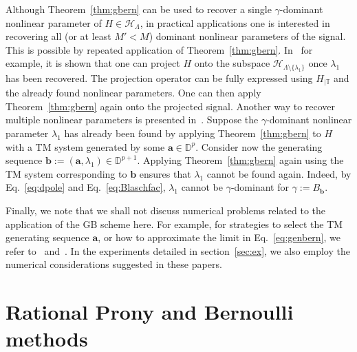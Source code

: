 \documentclass{arxiv}
\begin{document}
Although Theorem~\ref{thm:gbern} can be used to recover a single $\gamma$-dominant nonlinear parameter of $H \in \mathcal{H}_{\Lambda}$, in practical applications one is interested in recovering all (or at least $M' < M$) dominant nonlinear parameters of the signal. This is possible by repeated application of Theorem~\ref{thm:gbern}. In~\cite{SBS, SSSAB} for example, it is shown that one can project $H$ onto the subspace $\mathcal{H}_{\Lambda \setminus \{\lambda_1\}}$
once $\lambda_1$ has been recovered. The projection operator can be fully expressed using $H_{|\mathbb{T}}$ and the already found nonlinear parameters. One can then apply Theorem~\ref{thm:gbern} again onto the projected signal. Another way to recover multiple nonlinear parameters is presented in~\cite{siamdozsa, med24}. Suppose the $\gamma$-dominant nonlinear parameter $\lambda_1$ has already been found by applying Theorem~\ref{thm:gbern} to $H$ with a TM system generated by some $\boldsymbol{a} \in \mathbb{D}^p$. Consider now the generating sequence $\boldsymbol{b} := (\boldsymbol{a}, \lambda_1) \in \mathbb{D}^{p+1}$. Applying Theorem~\ref{thm:gbern} again using the TM system corresponding to $\boldsymbol{b}$ ensures that $\lambda_1$ cannot be found again. Indeed, by Eq.~\eqref{eq:dpole} and Eq.~\eqref{eq:Blaschfac}, $\lambda_1$ cannot be $\gamma$-dominant for $\gamma := B_{\boldsymbol{b}}$. 

Finally, we note that we shall not discuss numerical problems related to the application of the GB scheme here. For example, for strategies to select the TM generating sequence $\boldsymbol{a}$, or how to approximate the limit in Eq.~\eqref{eq:genbern}, we refer to~\cite{siamdozsa} and~\cite{med24}. In the experiments detailed in section~\ref{sec:ex}, we also employ the numerical considerations suggested in these papers.

\section{Rational Prony and Bernoulli methods}
\label{sec:genRat}
\end{document}
